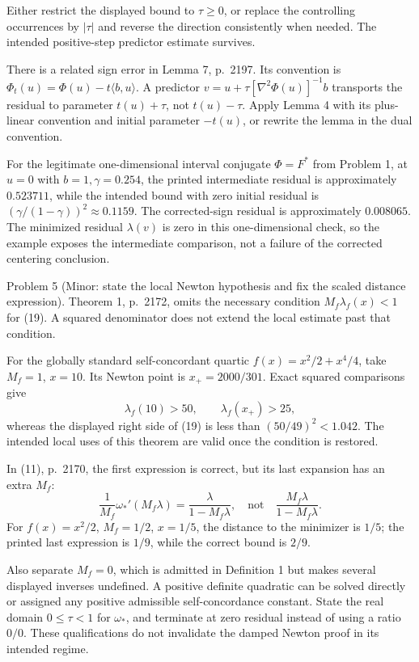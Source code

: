 \documentclass[10pt]{article}
\begin{document}
Either restrict the displayed bound to \(\tau\geq0\), or replace the controlling occurrences by \(|\tau|\) and reverse the direction consistently when needed. The intended positive-step predictor estimate survives.\par
There is a related sign error in Lemma 7, p. 2197. Its convention is \(\Phi_t(u)=\Phi(u)-t\langle b,u\rangle\). A predictor \(v=u+\tau[\nabla^2\Phi(u)]^{-1}b\) transports the residual to parameter \(t(u)+\tau\), not \(t(u)-\tau\). Apply Lemma 4 with its plus-linear convention and initial parameter \(-t(u)\), or rewrite the lemma in the dual convention.\par
For the legitimate one-dimensional interval conjugate \(\Phi=F^\ast\) from Problem 1, at \(u=0\) with \(b=1,\gamma=0.254\), the printed intermediate residual is approximately \(0.523711\), while the intended bound with zero initial residual is \((\gamma/(1-\gamma))^2\approx0.1159\). The corrected-sign residual is approximately \(0.008065\). The minimized residual \(\lambda(v)\) is zero in this one-dimensional check, so the example exposes the intermediate comparison, not a failure of the corrected centering conclusion.\par
Problem 5 (Minor: state the local Newton hypothesis and fix the scaled distance expression).  Theorem 1, p. 2172, omits the necessary condition \(M_f\lambda_f(x)<1\) for (19). A squared denominator does not extend the local estimate past that condition.\par
For the globally standard self-concordant quartic \(f(x)=x^2/2+x^4/4\), take \(M_f=1\), \(x=10\). Its Newton point is \(x_+=2000/301\). Exact squared comparisons give \[\lambda_f(10)>50,\qquad \lambda_f(x_+)>25,\] whereas the displayed right side of (19) is less than \((50/49)^2<1.042\). The intended local uses of this theorem are valid once the condition is restored.\par
In (11), p. 2170, the first expression is correct, but its last expansion has an extra \(M_f\): \[\frac1{M_f}\omega_\ast'(M_f\lambda)
 =\frac{\lambda}{1-M_f\lambda},
 \quad\text{not}\quad
 \frac{M_f\lambda}{1-M_f\lambda}.\] For \(f(x)=x^2/2\), \(M_f=1/2\), \(x=1/5\), the distance to the minimizer is \(1/5\); the printed last expression is \(1/9\), while the correct bound is \(2/9\).\par
Also separate \(M_f=0\), which is admitted in Definition 1 but makes several displayed inverses undefined. A positive definite quadratic can be solved directly or assigned any positive admissible self-concordance constant. State the real domain \(0\leq\tau<1\) for \(\omega_\ast\), and terminate at zero residual instead of using a ratio \(0/0\). These qualifications do not invalidate the damped Newton proof in its intended regime.\par
\end{document}

